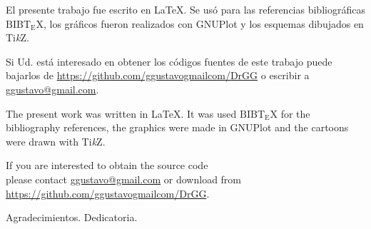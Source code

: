 \vspace*{\fill}
\begin{center}
	\begin{minipage}{0.70\textwidth}
	
    \begin{center}
	\scriptsize{
		El presente trabajo fue escrito en \LaTeX. Se usó para las referencias bibliográficas $\mathrm{B{\scriptstyle{IB}} \! T\!_{\displaystyle E} \! X}$, los gráficos fueron realizados con GNUPlot y los esquemas dibujados en Ti\textit{k}Z.
		
		\vspace*{1mm}
		
		Si Ud. está interesado en obtener los códigos fuentes de este trabajo puede bajarlos de 
		\url{https://github.com/ggustavogmailcom/DrGG} o escribir a \href{mailto:ggustavo@gmail.com}{ggustavo@gmail.com}.
		
		\vspace*{1cm}
		
		The present work was written in \LaTeX. It was used $\mathrm{B{\scriptstyle{IB}} \! T\!_{\displaystyle E} \! X}$ for the bibliography references, the graphics were made in GNUPlot and the cartoons were drawn with Ti\textit{k}Z.
			
		\vspace*{1mm}
		
		If you are interested to obtain the source code \\ please contact \href{mailto:ggustavo@gmail.com}{ggustavo@gmail.com} or download from \url{https://github.com/ggustavogmailcom/DrGG}.
		}
	\end{center}

	\end{minipage}
\end{center}
\vfill
\cleardoublepage

\mtcaddchapter[Agradecimientos]
Agradecimientos. Dedicatoria.

\cleardoublepage

